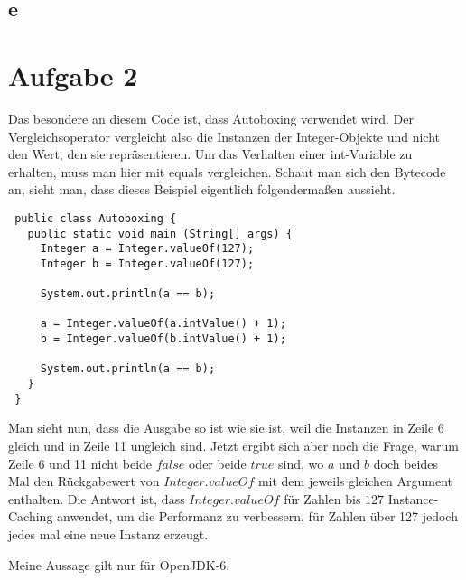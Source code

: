\documentclass[a4paper,10pt]{article}
\begin{document}
\subsection*{e}

\section*{Aufgabe 2}

Das besondere an diesem Code ist, dass Autoboxing verwendet wird.
Der Vergleichsoperator vergleicht also die Instanzen der Integer-Objekte und nicht den Wert, den sie repräsentieren.
Um das Verhalten einer int-Variable zu erhalten, muss man hier mit equals vergleichen.
Schaut man sich den Bytecode an, sieht man, dass dieses Beispiel eigentlich folgendermaßen aussieht.
\begin{lstlisting}
 public class Autoboxing {
   public static void main (String[] args) {
     Integer a = Integer.valueOf(127);
     Integer b = Integer.valueOf(127);

     System.out.println(a == b);

     a = Integer.valueOf(a.intValue() + 1);
     b = Integer.valueOf(b.intValue() + 1);

     System.out.println(a == b);
   }
 }
\end{lstlisting}
Man sieht nun, dass die Ausgabe so ist wie sie ist, weil die Instanzen in Zeile 6 gleich und in Zeile 11 ungleich sind.
Jetzt ergibt sich aber noch die Frage, warum Zeile 6 und 11 nicht beide $false$ oder beide $true$ sind, wo $a$ und $b$ doch beides Mal den Rückgabewert von $Integer.valueOf$ mit dem jeweils gleichen Argument enthalten.
Die Antwort ist, dass $Integer.valueOf$ für Zahlen bis $127$ Instance-Caching anwendet, um die Performanz zu verbessern, für Zahlen über 127 jedoch jedes mal eine neue Instanz erzeugt.

Meine Aussage gilt nur für OpenJDK-6.
\end{document}
